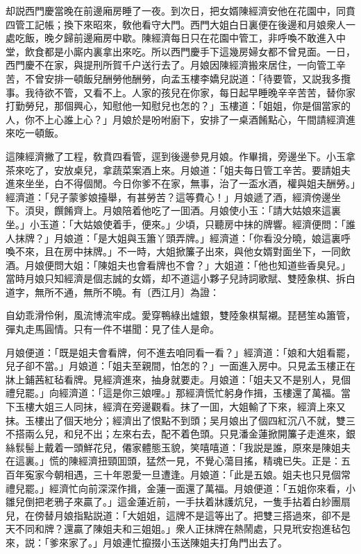 却説西門慶當晚在前邊廂房睡了一夜。到次日，把女婿陳經濟安他在花園中，同賁四管工記帳；換下來昭來，敎他看守大門。西門大姐白日裏便在後邊和月娘衆人一處吃飯，晚夕歸前邊廂房中歇。陳經濟每日只在花園中管工，非呼喚不敢進入中堂，飲食都是小廝内裏拿出來吃。所以西門慶手下這幾房婦女都不曾見面。一日，西門慶不在家，與提刑所賀千户送行去了。月娘因陳經濟搬來居住，一向管工辛苦，不曾安排一頓飯兒酬勞他酬勞，向孟玉樓李嬌兒説道：「待要管，又説我多攬事。我待欲不管，又看不上。人家的孩兒在你家，每日起早睡晚辛辛苦苦，替你家打勤勞兒，那個興心，知慰他一知慰兒也怎的？」玉樓道：「姐姐，你是個當家的人，你不上心誰上心？」月娘於是吩咐廚下，安排了一桌酒餚點心，午間請經濟進來吃一頓飯。

這陳經濟撇了工程，敎賁四看管，逕到後邊參見月娘。作畢揖，旁邊坐下。小玉拿茶來吃了，安放桌兒，拿蔬菜案酒上來。月娘道：「姐夫每日管工辛苦。要請姐夫進來坐坐，白不得個閒。今日你爹不在家，無事，治了一盃水酒，權與姐夫酬勞。」經濟道：「兒子蒙爹娘擡舉，有甚勞苦？這等費心！」月娘遞了酒，經濟傍邊坐下。湏臾，饌餚齊上。月娘陪着他吃了一囬酒。月娘使小玉：「請大姑娘來這裏坐。」小玉道：「大姑娘使着手，便來。」少頃，只聽房中抹的牌響。經濟便問：「誰人抹牌？」月娘道：「是大姐與玉簫丫頭弄牌。」經濟道：「你看没分曉，娘這裏呼喚不來，且在房中抹牌。」不一時，大姐掀簾子出來，與他女婿對面坐下，一同飲酒。月娘便問大姐：「陳姐夫也會看牌也不會？」大姐道：「他也知道些香臭兒。」當時月娘只知經濟是個志誠的女婿，却不道這小夥子兒詩詞歌賦、雙陸象棋、拆白道字，無所不通，無所不曉。有〔西江月〕為證：

\begin{myquote}
自幼乖滑伶俐，風流博流牢成。愛穿鴨綠出爐銀，雙陸象棋幫襯。琵琶笙ぬ簫管，彈丸走馬圓情。只有一件不堪聞：見了佳人是命。
\end{myquote}

月娘便道：「既是姐夫會看牌，何不進去咱同看一看？」經濟道：「娘和大姐看罷，兒子卻不當。」月娘道：「姐夫至親間，怕怎的？」一面進入房中。只見孟玉樓正在牀上鋪茜紅毡看牌。見經濟進來，抽身就要走。月娘道：「姐夫又不是别人，見個禮兒罷。」向經濟道：「這是你三娘哩。」那經濟慌忙躬身作揖，玉樓還了萬福。當下玉樓大姐三人同抹，經濟在旁邊觀看。抹了一囬，大姐輸了下來，經濟上來又抹。玉樓出了個天地分；經濟出了恨點不到頭；吴月娘出了個四紅沉八不就，雙三不搭兩么兒，和兒不出；左來右去，配不着色頭。只見潘金蓮掀開簾子走進來，銀絲䯼髻上戴着一頭鮮花兒，僊家體態玉貌，笑嘻嘻道：「我説是誰，原來是陳姐夫在這裏。」慌的陳經濟扭頸囬頭，猛然一見，不覺心蕩目搖，精魂已失。正是：五百年寃家今朝相遇，三十年恩愛一旦遭逢。月娘道：「此是五娘。姐夫也只見個常禮兒罷。」經濟忙向前深深作揖，金蓮一面還了萬福。月娘便道：「五姐你來看，小雛兒倒把老鴉子來贏了。」這金蓮近前，一手扶着牀護炕兒，一隻手拈着白紗團扇兒，在傍替月娘指點説道：「大姐姐，這牌不是這等出了。把雙三搭過來，卻不是天不同和牌？還贏了陳姐夫和三姐姐。」衆人正抹牌在熱鬧處，只見玳安抱進毡包來，説：「爹來家了。」月娘連忙攛掇小玉送陳姐夫打角門出去了。


